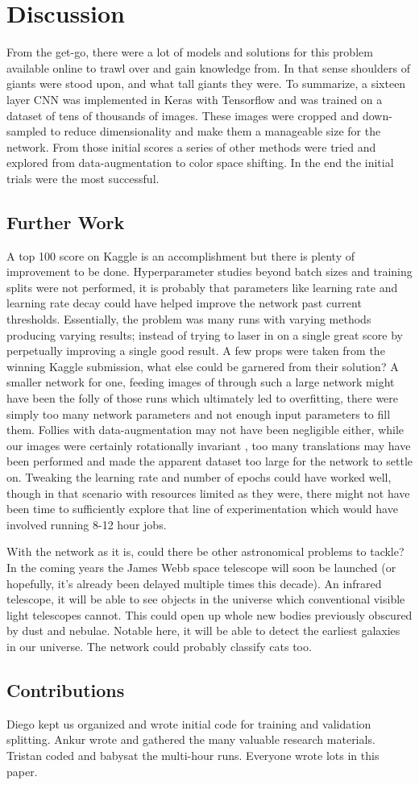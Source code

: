 \section{Discussion}

From the get-go, there were a lot of models and solutions for this problem available online to trawl over and gain knowledge from. In that sense shoulders of giants were stood upon, and what tall giants they were. To summarize, a sixteen layer CNN was implemented in Keras with Tensorflow and was trained on a dataset of tens of thousands of images. These images were cropped and down-sampled to reduce dimensionality and make them a manageable size for the network. From those initial scores a series of other methods were tried and explored from data-augmentation to color space shifting. In the end the initial trials were the most successful. 

\subsection{Further Work}
A top 100 score on Kaggle is an accomplishment but there is plenty of improvement to be done. Hyperparameter studies beyond batch sizes and training splits were not performed, it is probably that parameters like learning rate and learning rate decay could have helped improve the network past current thresholds. Essentially, the problem was many runs with varying methods producing varying results; instead of trying to laser in on a single great score by perpetually improving a single good result. A few props were taken from the winning Kaggle submission, what else could be garnered from their solution? A smaller network for one, feeding images of  through such a large network might have been the folly of those runs which ultimately led to overfitting, there were simply too many network parameters and not enough input parameters to fill them. Follies with data-augmentation may not have been negligible either, while our images were certainly rotationally invariant , too many translations may have been performed and made the apparent dataset too large for the network to settle on. Tweaking the learning rate and number of epochs could have worked well, though in that scenario with resources limited as they were, there might not have been time to sufficiently explore that line of experimentation which would have involved running 8-12 hour jobs.

With the network as it is, could there be other astronomical problems to tackle? In the coming years the James Webb space telescope will soon be launched (or hopefully, it's already been delayed multiple times this decade). An infrared telescope, it will be able to see objects in the universe which conventional visible light telescopes cannot. This could open up whole new bodies previously obscured by dust and nebulae. Notable here, it will be able to detect the earliest galaxies in our universe. The network could probably classify cats too.

\subsection{Contributions}
Diego kept us organized and wrote initial code for training and validation splitting. Ankur wrote and gathered the many valuable research materials. Tristan coded and babysat the multi-hour runs. Everyone wrote lots in this paper.
